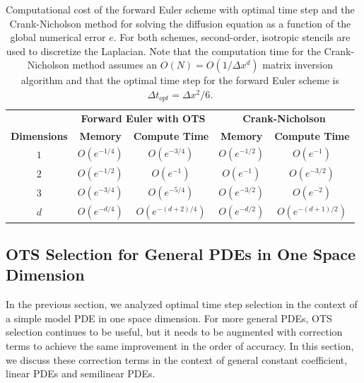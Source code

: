 \documentclass[fleqn,12pt,twoside]{article}
\def\dt{\Delta t}
\def\dx{\Delta x}
\def\dto{\dt_{opt}}
\begin{document}
\begin{table}[tb]
\caption{
Computational cost of the forward Euler scheme with optimal time step and 
the Crank-Nicholson method for solving the diffusion equation as a function 
of the global numerical error $e$.
For both schemes, second-order, isotropic stencils are used to discretize 
the Laplacian.  
Note that the computation time for the Crank-Nicholson method assumes an 
$O(N) = O \left( 1/\dx^d \right)$ matrix inversion algorithm 
and that the optimal time step for the forward Euler scheme is $\dto = \dx^2/6$.
}
\label{tab:comp_perf_vs_dim}
\renewcommand{\arraystretch}{1.5}
\begin{tabular}{ccccc}
  \hline
  & \multicolumn{2}{c}{\bf Forward Euler with OTS} 
  & \multicolumn{2}{c}{\bf Crank-Nicholson} \\
  \cline{2-3} \cline{4-5} 
    {\bf Dimensions} & {\bf Memory} & {\bf Compute Time} 
  & {\bf Memory} & {\bf Compute Time} \\
  \hline 
  $1$ & $O\left( e^{-1/4} \right)$ 
      & $O\left( e^{-3/4} \right)$ 
      & $O\left( e^{-1/2} \right)$ 
      & $O\left( e^{-1} \right)$ \\ 
  $2$ & $O\left( e^{-1/2} \right)$ 
      & $O\left( e^{-1} \right)$ 
      & $O\left( e^{-1} \right)$ 
      & $O\left( e^{-3/2} \right)$ \\ 
  $3$ & $O\left( e^{-3/4} \right)$ 
      & $O\left( e^{-5/4} \right)$ 
      & $O\left( e^{-3/2} \right)$ 
      & $O\left( e^{-2} \right)$ \\
  $d$ & $O\left( e^{-d/4} \right)$ 
      & $O\left( e^{-(d+2)/4} \right)$ 
      & $O\left( e^{-d/2} \right)$ 
      & $O\left( e^{-(d+1)/2} \right)$ \\ 
  \hline 
\end{tabular}
\end{table}



\subsection{\label{sec:ots_general_1d_pdes} 
            OTS Selection for General PDEs in One Space Dimension} 
In the previous section, we analyzed optimal time step selection in the 
context of a simple model PDE in one space dimension.  For more general PDEs, 
OTS selection continues to be useful, but it needs to be augmented with 
correction terms to achieve the same improvement in the order of accuracy.  
In this section, we discuss these correction terms in the context of general 
constant coefficient, linear PDEs and semilinear PDEs. 
\end{document}

